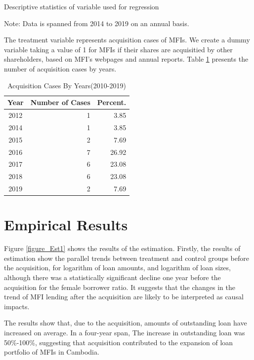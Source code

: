 \documentclass[a4j,12pt]{article}
\begin{document}
\begin{table}[h]
\small
  \caption{Descriptive statistics of variable used for regression }
  \label{table_des}
  \centering
  

  \footnotesize  \raggedright 
  Note: Data is spanned from 2014 to 2019 on an annual basis.
\end{table}

The treatment variable represents acquisition cases of MFIs. We create a dummy variable taking a value of 1 for MFIs if their shares are acquisitied by other shareholders, based on MFI’s webpages and annual reports. Table \ref{table_MA} presents the number of acquisition cases by years.


\begin{table}[h]
  \caption{Acquisition Cases By Years(2010-2019)}
  \label{table_MA}
  \centering
  \small
  \begin{tabular}{crr}
    \hline 
    Year & Number of Cases & Percent. \\
	 \hline  \hline 
   2012 &	1	&3.85 \\
   2014	& 1	&3.85  \\
   2015	& 2	&7.69 \\
   2016	& 7	&26.92 \\
   2017	& 6	&23.08 \\
   2018	& 6	&23.08 \\
   2019	& 2	& 7.69 \\
   \hline 
  \end{tabular}
\end{table}



\section{Empirical Results} 
Figure \ref{figure_Est1} shows the results of the estimation. Firstly, the results of estimation show the parallel trends between treatment and control groups before the acquisition, for logarithm of loan amounts, and logarithm of loan sizes, although there was a statistically significant decline one year before the acquisition for the female borrower ratio. It suggests that the changes in the trend of MFI lending after the acquisition are likely to be interpreted as causal impacts.  

The results show that, due to the acquisition, amounts of outstanding loan have increased on average. In a four-year span, The increase in outstanding loan was 50\%-100\%, suggesting that acquisition contributed to the expansion of loan portfolio of MFIs in Cambodia.
\end{document}
